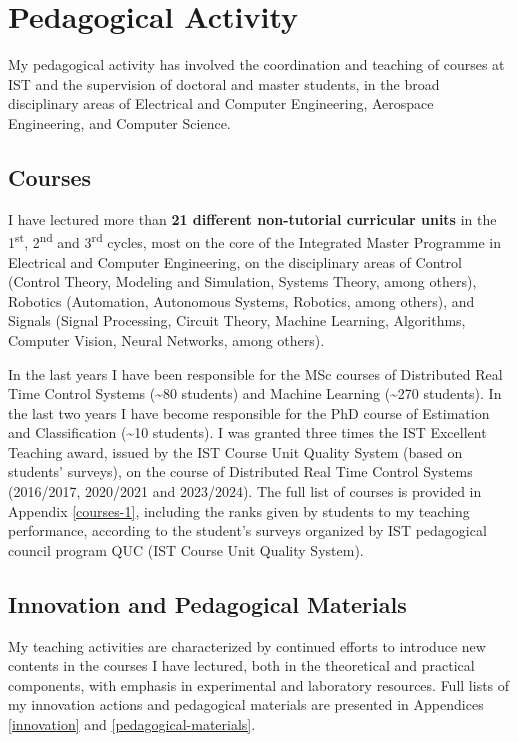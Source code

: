 \section{Pedagogical Activity}\label{pedagogical-activity}

My pedagogical activity has involved the coordination and teaching of
courses at IST and the supervision of doctoral and master students, in
the broad disciplinary areas of Electrical and Computer Engineering,
Aerospace Engineering, and Computer Science.

\subsection{Courses}\label{courses}

I have lectured more than \textbf{21 different non-tutorial curricular
units} in the 1\textsuperscript{st}, 2\textsuperscript{nd} and
3\textsuperscript{rd} cycles, most on the core of the Integrated Master
Programme in Electrical and Computer Engineering, on the disciplinary
areas of Control (Control Theory, Modeling and Simulation, Systems
Theory, among others), Robotics (Automation, Autonomous Systems,
Robotics, among others), and Signals (Signal Processing, Circuit Theory,
Machine Learning, Algorithms, Computer Vision, Neural Networks, among
others).

In the last years I have been responsible for the MSc courses of
Distributed Real Time Control Systems (\textasciitilde80 students) and
Machine Learning (\textasciitilde270 students). In the last two years I
have become responsible for the PhD course of Estimation and
Classification (\textasciitilde10 students). I was granted three times
the IST Excellent Teaching award, issued by the IST Course Unit Quality
System (based on students' surveys), on the course of Distributed Real
Time Control Systems (2016/2017, 2020/2021 and 2023/2024). The full list
of courses is provided in Appendix \ref{courses-1}, including the ranks given by
students to my teaching performance, according to the student's surveys
organized by IST pedagogical council program QUC (IST Course Unit
Quality System).

\subsection{Innovation and Pedagogical
Materials}\label{innovation-and-pedagogical-materials}

My teaching activities are characterized by continued efforts to
introduce new contents in the courses I have lectured, both in the
theoretical and practical components, with emphasis in experimental and
laboratory resources. Full lists of my innovation actions and
pedagogical materials are presented in Appendices \ref{innovation} and \ref{pedagogical-materials}.

